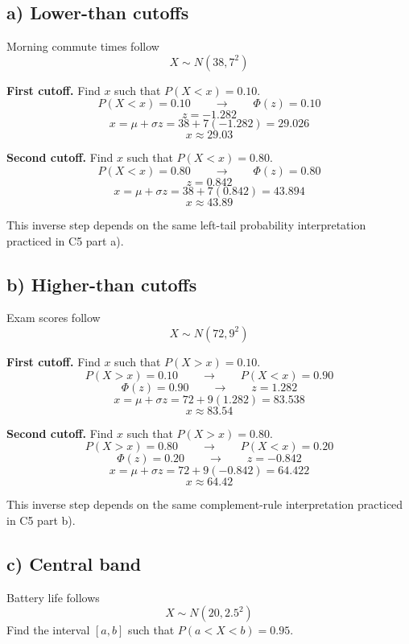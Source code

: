 	\subsection*{a) Lower-than cutoffs}
	\label{subsec:inverse-normal-problems-c7-a}
	Morning commute times follow
	\[
	X\sim N(38,7^2)
	\]
	
	\textbf{First cutoff.} Find \(x\) such that \(P(X<x)=0.10\).
	\[
	P(X<x)=0.10
	\qquad \longrightarrow \qquad
	\Phi(z)=0.10
	\]
	\[
	z=-1.282
	\]
	\[
	x=\mu+\sigma z
	=38+7(-1.282)
	=29.026
	\]
	\[
	x\approx 29.03
	\]
	
	\textbf{Second cutoff.} Find \(x\) such that \(P(X<x)=0.80\).
	\[
	P(X<x)=0.80
	\qquad \longrightarrow \qquad
	\Phi(z)=0.80
	\]
	\[
	z=0.842
	\]
	\[
	x=\mu+\sigma z
	=38+7(0.842)
	=43.894
	\]
	\[
	x\approx 43.89
	\]
	
	This inverse step depends on the same left-tail probability interpretation practiced in C5 part a).
	
	
	\subsection*{b) Higher-than cutoffs}
	\label{subsec:inverse-normal-problems-c7-b}
	Exam scores follow
	\[
	X\sim N(72,9^2)
	\]
	
	\textbf{First cutoff.} Find \(x\) such that \(P(X>x)=0.10\).
	\[
	P(X>x)=0.10
	\qquad \longrightarrow \qquad
	P(X<x)=0.90
	\]
	\[
	\Phi(z)=0.90
	\qquad \longrightarrow \qquad
	z=1.282
	\]
	\[
	x=\mu+\sigma z
	=72+9(1.282)
	=83.538
	\]
	\[
	x\approx 83.54
	\]
	
	\textbf{Second cutoff.} Find \(x\) such that \(P(X>x)=0.80\).
	\[
	P(X>x)=0.80
	\qquad \longrightarrow \qquad
	P(X<x)=0.20
	\]
	\[
	\Phi(z)=0.20
	\qquad \longrightarrow \qquad
	z=-0.842
	\]
	\[
	x=\mu+\sigma z
	=72+9(-0.842)
	=64.422
	\]
	\[
	x\approx 64.42
	\]
	
	This inverse step depends on the same complement-rule interpretation practiced in C5 part b).
	
	
	\subsection*{c) Central band}
	\label{subsec:inverse-normal-problems-c7-c}
	Battery life follows
	\[
	X\sim N(20,2.5^2)
	\]
	Find the interval \([a,b]\) such that \(P(a<X<b)=0.95\).
	
